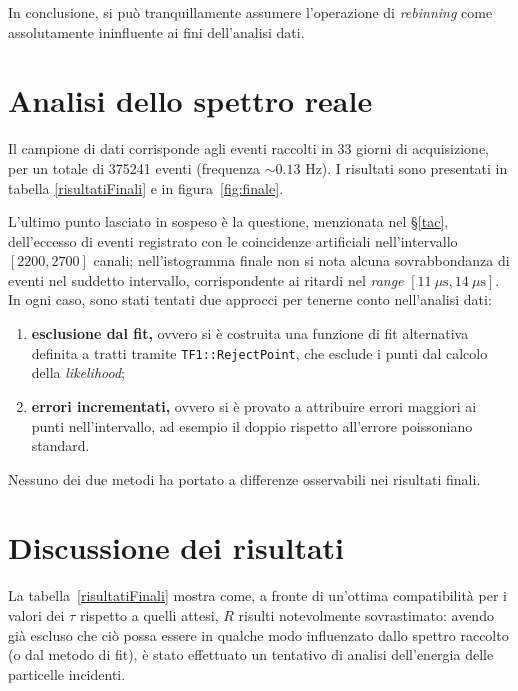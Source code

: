 \documentclass[10pt, oneside, a4paper]{article}   	%
\begin{document}
In conclusione, si può tranquillamente assumere l'operazione di \textit{rebinning} come assolutamente ininfluente ai fini dell'analisi dati.
%
\section{Analisi dello spettro reale} \label{analisireale}
Il campione di dati corrisponde agli eventi raccolti in 33 giorni di acquisizione, per un totale di 375241 eventi (frequenza $\sim0.13$ Hz). I risultati sono presentati in tabella \ref{risultatiFinali} e in figura~\ref{fig:finale}.

L'ultimo punto lasciato in sospeso è la questione, menzionata nel \S\ref{tac}, dell'eccesso di eventi registrato con le coincidenze artificiali nell'intervallo $[2200,2700]$ canali; nell'istogramma finale non si nota alcuna sovrabbondanza di eventi nel suddetto intervallo, corrispondente ai ritardi nel \emph{range} $[11 \ \mu \mbox{s}, 14 \ \mu \mbox{s}]$. In ogni caso, sono stati tentati due approcci per tenerne conto nell'analisi dati:
\begin{enumerate}
  \item \textbf{esclusione dal fit,} ovvero si è costruita una funzione di fit alternativa definita a tratti tramite \lstinline{TF1::RejectPoint}, che esclude i punti dal calcolo della \textit{likelihood};
  \item \textbf{errori incrementati,} ovvero si è provato a attribuire errori maggiori ai punti nell'intervallo, ad esempio il doppio rispetto all'errore poissoniano standard.
\end{enumerate}
Nessuno dei due metodi ha portato a differenze osservabili nei risultati finali.
%
\section{Discussione dei risultati}

La tabella~\ref{risultatiFinali} mostra come, a fronte di un'ottima compatibilità per i valori dei $\tau$ rispetto a quelli attesi, $R$ risulti notevolmente sovrastimato: avendo già escluso che ciò possa essere in qualche modo influenzato dallo spettro raccolto (o dal metodo di fit), è stato effettuato un tentativo di analisi dell'energia delle particelle incidenti.
\end{document}
